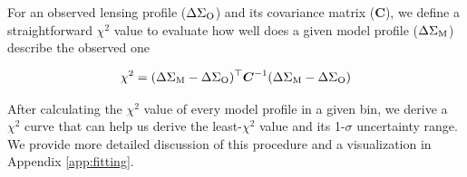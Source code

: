\documentclass[fleqn,usenatbib,useAMS,english]{mnras}
\begin{document}
    For an observed lensing profile ($\Delta\Sigma_{\rm O}$) and its covariance matrix
    ($\boldsymbol{C}$), we define a straightforward $\chi^2$ value to evaluate how well does a
    given model profile ($\Delta\Sigma_{\rm M}$) describe the observed one

    \begin{equation}
        \chi^{2}=(\Delta\Sigma_{\rm M}-\Delta\Sigma_{\rm O})^{\top} \boldsymbol{C}^{-1}(\Delta\Sigma_{\rm M}-\Delta\Sigma_{\rm O})
        \label{eq:chi2}
    \end{equation}

    \noindent
    After calculating the $\chi^2$ value of every model \dsigma{} profile in a given
    \topn{} bin, we derive a $\chi^2$ curve that can help us derive the least-$\chi^2$
    \scatterMhaloObsSym{} value and its 1-$\sigma$ uncertainty range.
    We provide more detailed discussion of this procedure and a visualization in Appendix
    \ref{app:fitting}.
\end{document}
